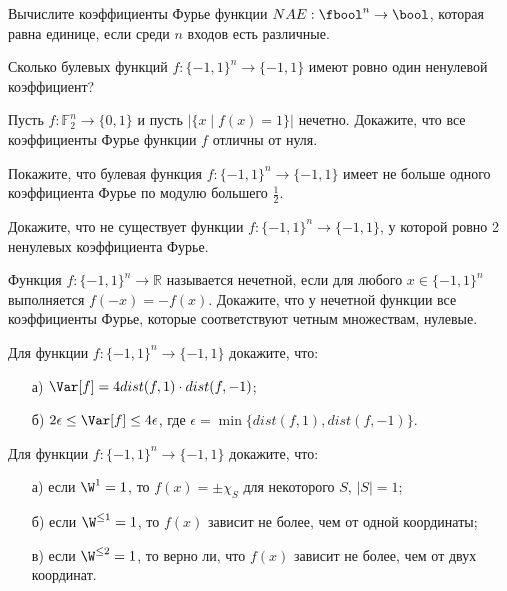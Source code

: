 
\begin{task}
    Вычислите коэффициенты Фурье функции $NAE: \fbool^n \to \bool$, которая равна единице, если среди $n$ входов есть
    различные.
\end{task}


\begin{task}
    Сколько булевых функций $f: \{-1, 1\}^n \to \{-1, 1\}$ имеют ровно один ненулевой коэффициент?
\end{task}

\begin{task}
    Пусть $f: \mathbb{F}_2^n \to \{0, 1\}$ и пусть $|\{x \mid f(x) = 1\}|$ нечетно. Докажите, что все коэффициенты Фурье функции
    $f$ отличны от нуля.
\end{task}


\begin{task}
    Покажите, что булевая функция $f: \{-1, 1\}^n \to \{-1, 1\}$ имеет не больше одного коэффициента Фурье по модулю большего
    $\frac{1}{2}$.
\end{task}


\begin{task}
    Докажите, что не существует функции $f: \{-1, 1\}^n \to \{-1, 1\}$, у которой ровно 2 ненулевых коэффициента Фурье.
\end{task}


\begin{task}
    Функция $f: \{-1, 1\}^n \to \mathbb{R}$ называется нечетной, если для любого $x \in \{-1, 1\}^n$ выполняется $f(-x) =
    -f(x)$. Докажите, что у нечетной функции все коэффициенты Фурье, которые соответствуют четным множествам, нулевые.
\end{task}

\begin{task}
    Для функции $f: \{-1, 1\}^n \to \{-1, 1\}$ докажите, что:
	\begin{enumerate}[topsep = 0pt, itemsep = -1ex]
        \item [а)] $\Var[f] = 4 dist(f, 1) \cdot dist(f, -1)$;
        \item [б)] $2 \epsilon \le \Var[f] \le 4 \epsilon$, где $\epsilon = \min \{dist(f, 1), dist(f, -1)\}$.
	\end{enumerate}
\end{task}


\begin{task}
    Для функции $f: \{-1, 1\}^n \to \{-1, 1\}$ докажите, что:
   	\begin{enumerate}[topsep = 0pt, itemsep = -1ex]
        \item [а)] если $\W^{1} = 1$, то $f(x) = \pm \chi_{S}$ для некоторого $S$, $|S| = 1$;
        \item [б)] если $\W^{\le 1} = 1$, то $f(x)$ зависит не более, чем от одной координаты;
        \item [в)] если $\W^{\le 2} = 1$, то верно ли, что $f(x)$ зависит не более, чем от двух координат.
	\end{enumerate}
\end{task}



